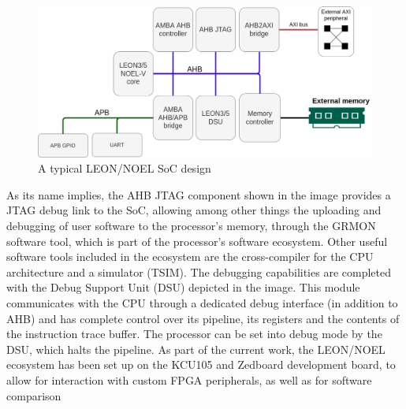 	\begin{figure}
		\centering
		\includegraphics[width=0.8\linewidth]{Figures/LEONSoC.png}
		\caption{A typical LEON/NOEL SoC design}
		\label{fig:LEONSoC}
	\end{figure}
As its name implies, the AHB JTAG component shown in the image provides a JTAG debug link to the SoC, allowing among other things the uploading and debugging of user software to the processor's memory, through the GRMON software tool, which is part of the processor's software ecosystem. Other useful software tools included in the ecosystem are the cross-compiler for the CPU architecture and a simulator (TSIM). The debugging capabilities are completed with the Debug Support Unit (DSU) depicted in the image. This module communicates with the CPU through a dedicated debug interface (in addition to AHB) and has complete control over its pipeline, its registers and the contents of the instruction trace buffer. The processor can be set into debug mode by the DSU, which halts the pipeline. As part of the current work, the LEON/NOEL ecosystem has been set up on the KCU105 and Zedboard development board, to allow for interaction with custom FPGA peripherals, as well as for software comparison\par


